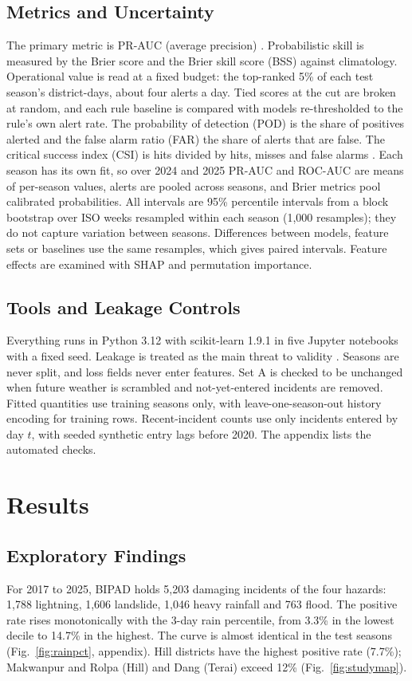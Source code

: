 \documentclass[conference]{IEEEtran}
\begin{document}
\subsection{Metrics and Uncertainty}
\label{sec:metrics}
The primary metric is PR-AUC (average precision) \cite{Saito2015}. Probabilistic skill is measured by the Brier score \cite{Brier1950} and the Brier skill score (BSS) against climatology. Operational value is read at a fixed budget: the top-ranked 5\% of each test season's district-days, about four alerts a day. Tied scores at the cut are broken at random, and each rule baseline is compared with models re-thresholded to the rule's own alert rate. The probability of detection (POD) is the share of positives alerted and the false alarm ratio (FAR) the share of alerts that are false. The critical success index (CSI) is hits divided by hits, misses and false alarms \cite{Wilks2019}. Each season has its own fit, so over 2024 and 2025 PR-AUC and ROC-AUC are means of per-season values, alerts are pooled across seasons, and Brier metrics pool calibrated probabilities. All intervals are 95\% percentile intervals from a block bootstrap over ISO weeks resampled within each season (1,000 resamples); they do not capture variation between seasons. Differences between models, feature sets or baselines use the same resamples, which gives paired intervals. Feature effects are examined with SHAP \cite{Lundberg2017} and permutation importance.

\subsection{Tools and Leakage Controls}
Everything runs in Python 3.12 with scikit-learn 1.9.1 in five Jupyter notebooks with a fixed seed. Leakage is treated as the main threat to validity \cite{Kapoor2023}. Seasons are never split, and loss fields never enter features. Set A is checked to be unchanged when future weather is scrambled and not-yet-entered incidents are removed. Fitted quantities use training seasons only, with leave-one-season-out history encoding for training rows. Recent-incident counts use only incidents entered by day $t$, with seeded synthetic entry lags before 2020. The appendix lists the automated checks.

\section{Results}
\label{sec:results}
\subsection{Exploratory Findings}
For 2017 to 2025, BIPAD holds 5,203 damaging incidents of the four hazards: 1,788 lightning, 1,606 landslide, 1,046 heavy rainfall and 763 flood. The positive rate rises monotonically with the 3-day rain percentile, from 3.3\% in the lowest decile to 14.7\% in the highest. The curve is almost identical in the test seasons (Fig.~\ref{fig:rainpct}, appendix). Hill districts have the highest positive rate (7.7\%); Makwanpur and Rolpa (Hill) and Dang (Terai) exceed 12\% (Fig.~\ref{fig:studymap}).
\end{document}
